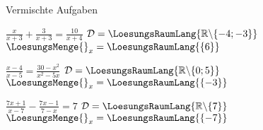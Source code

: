 \platzFuerBerechnungenBisEndeSeite{}




Vermischte Aufgaben


\begin{bbwAufgabenBlock}
\item $\frac{x}{x+3} + \frac{3}{x+3} = \frac{10}{x+4}$ \hspace{10mm}
$\mathcal{D}= \LoesungsRaumLang{\mathbb{R}\backslash\{-4;-3\}}$
$\LoesungsMenge{}_x = \LoesungsRaumLang{\{  6  \}}$
\item $\frac{x-4}{x-5}  = \frac{30-x^2}{x^2-5x}$ \hspace{10mm}
$\mathcal{D}= \LoesungsRaumLang{\mathbb{R}\backslash\{0;5 \}}$
$\LoesungsMenge{}_x = \LoesungsRaumLang{\{  -3  \}}$
\item $\frac{7x+1}{x-7}   - \frac{7x-1}{7-x} = 7$ \hspace{10mm}
$\mathcal{D}= \LoesungsRaumLang{\mathbb{R}\backslash\{7 \}}$
$\LoesungsMenge{}_x = \LoesungsRaumLang{\{  -7  \}}$

\end{bbwAufgabenBlock}

\platzFuerBerechnungenBisEndeSeite{}




